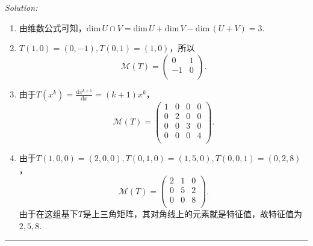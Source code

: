 \documentclass[a4[paper]{article}
\def\dim{\mathrm{dim}\,}
\def\sep{\bigskip
\noindent{}\rule{\textwidth}{0.1mm}
\bigskip}
\begin{document}
\noindent{}\emph{Solution:}
\begin{enumerate}[1.]
\item 由维数公式可知，$\dim U\cap V = \dim U+\dim V-\dim( U+V)=3.$
\item $T(1,0)=(0,-1), T(0,1)=(1,0)$，所以
\[\mathcal{M}(T)=
\begin{pmatrix}
0 & 1\\
-1 &0\\
\end{pmatrix}.\]
\item 由于$T(x^k) = \frac{\mathrm{d}x^{k+1}}{\mathrm{d}x}= (k+1)x^k$，
\[\mathcal{M}(T) =
\begin{pmatrix}
1&0&0&0\\
0&2&0&0\\
0&0&3&0\\
0&0&0&4\\
\end{pmatrix}.\]
\item 由于$T(1,0,0)=(2,0,0),T(0,1,0)=(1,5,0),T(0,0,1)=(0,2,8)$，
\[\mathcal{M}(T) =
\begin{pmatrix}
2&1&0\\
0&5&2\\
0&0&8\\
\end{pmatrix}.\]
由于在这组基下$T$是上三角矩阵，其对角线上的元素就是特征值，故特征值为$2,5,8$.
\end{enumerate}

\sep
\end{document}
